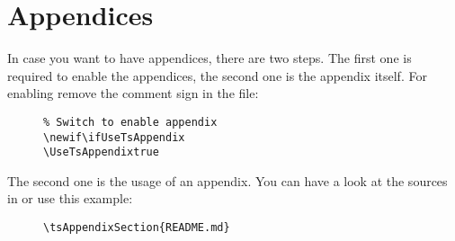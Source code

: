 
\section{Appendices}

In case you want to have appendices, there are two steps. The first one is
required to enable the appendices, the second one is the appendix itself.
For enabling remove the comment sign in the 
file:

\begin{figure}[H]
    \small
    \centering
    \begin{BVerbatim}
\newif\ifUseTsAppendix
\UseTsAppendixtrue
    \end{BVerbatim}
\end{figure}

The second one is the usage of an appendix. You can have a look at the sources
in  or use this example:

\begin{figure}[H]
    \small
    \centering
    \begin{BVerbatim}
\tsAppendixSection{README.md}
    \end{BVerbatim}
\end{figure}


